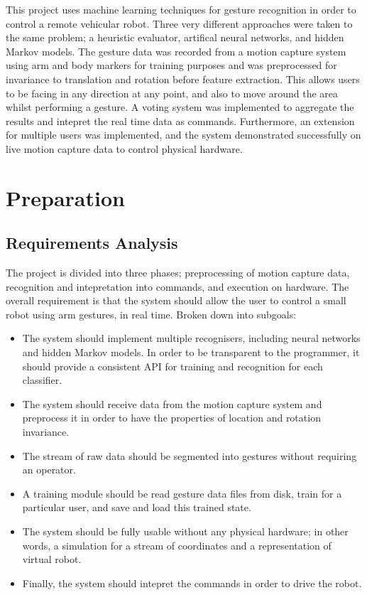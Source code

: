 \documentclass[12pt,a4,notitlepage]{report}
\renewcommand{\_}{\texttt{\symbol{95}}}
\newcommand{\<}{\texttt{\symbol{60}}}
\renewcommand{\>}{\texttt{\symbol{62}}}
\begin{document}
This project uses machine learning techniques for gesture recognition in order to control a remote vehicular robot. Three very different approaches were taken to the same problem; a heuristic evaluator, artifical neural networks, and hidden Markov models. The gesture data was recorded from a motion capture system using arm and body markers for training purposes and was preprocessed for invariance to translation and rotation before feature extraction. This allows users to be facing in any direction at any point, and also to move around the area whilst performing a gesture. A voting system was implemented to aggregate the results and intepret the real time data as commands. Furthermore, an extension for multiple users was implemented, and the system demonstrated successfully on live motion capture data to control physical hardware.

\chapter{Preparation}

\section{Requirements Analysis}

The project is divided into three phases; preprocessing of motion capture data, recognition and intepretation into commands, and execution on hardware. The overall requirement is that the system should allow the user to control a small robot using arm gestures, in real time. Broken down into subgoals:

\begin{itemize}
\item The system should implement multiple recognisers, including neural networks and hidden Markov models. In order to be transparent to the programmer, it should provide a consistent API for training and recognition for each classifier.
\item The system should receive data from the motion capture system and preprocess it in order to have the properties of location and rotation invariance.
\item The stream of raw data should be segmented into gestures without requiring an operator.
\item A training module should be read gesture data files from disk, train for a particular user, and save and load this trained state.
\item The system should be fully usable without any physical hardware; in other words, a simulation for a stream of coordinates and a representation of virtual robot.
\item Finally, the system should intepret the commands in order to drive the robot.
\end{itemize}
\end{document}
